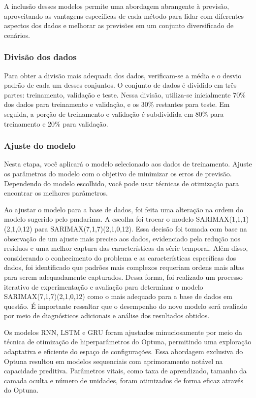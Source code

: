 A inclusão desses modelos permite uma abordagem abrangente à previsão, aproveitando as vantagens específicas de cada método para lidar com diferentes aspectos dos dados e melhorar as previsões em um conjunto diversificado de cenários.



\subsubsection{Divis\~ao dos dados}


Para obter a divisão mais adequada dos dados, verificam-se a média e o desvio padrão de cada um desses conjuntos. O conjunto de dados é dividido em três partes: treinamento, validação e teste. Nessa divisão, utiliza-se inicialmente 70\% dos dados para treinamento e validação, e os 30\% restantes para teste. Em seguida, a porção de treinamento e validação é subdividida em 80\% para treinamento e 20\% para validação.

\subsubsection{Ajuste do modelo}
Nesta etapa, você aplicará o modelo selecionado aos dados de treinamento. Ajuste os parâmetros do modelo com o objetivo de minimizar os erros de previsão. Dependendo do modelo escolhido, você pode usar técnicas de otimização para encontrar os melhores parâmetros.

Ao ajustar o modelo para a base de dados, foi feita uma alteração na ordem do modelo sugerido pelo pmdarima. A escolha foi trocar o modelo SARIMAX(1,1,1)(2,1,0,12) para SARIMAX(7,1,7)(2,1,0,12). Essa decisão foi tomada com base na observação de um ajuste mais preciso aos dados, evidenciado pela redução nos resíduos e uma melhor captura das características da série temporal. Além disso, considerando o conhecimento do problema e as características específicas dos dados, foi identificado que padrões mais complexos requeriam ordens mais altas para serem adequadamente capturados. Dessa forma, foi realizado um processo iterativo de experimentação e avaliação para determinar o modelo SARIMAX(7,1,7)(2,1,0,12) como o mais adequado para a base de dados em questão. É importante ressaltar que o desempenho do novo modelo será avaliado por meio de diagnósticos adicionais e análise dos resultados obtidos.

Os modelos RNN, LSTM e GRU foram ajustados minuciosamente por meio da técnica de otimização de hiperparâmetros do Optuna, permitindo uma exploração adaptativa e eficiente do espaço de configurações. Essa abordagem exclusiva do Optuna resultou em modelos sequenciais com aprimoramento notável na capacidade preditiva. Parâmetros vitais, como taxa de aprendizado, tamanho da camada oculta e número de unidades, foram otimizados de forma eficaz através do Optuna.

